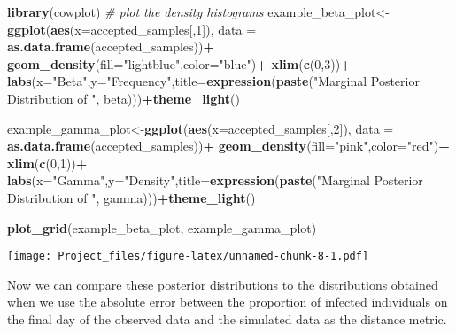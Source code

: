 \documentclass[
]{article}
\newenvironment{Shaded}{\begin{snugshade}}{\end{snugshade}}
\newcommand{\AttributeTok}[1]{\textcolor[rgb]{0.13,0.29,0.53}{#1}}
\newcommand{\CommentTok}[1]{\textcolor[rgb]{0.56,0.35,0.01}{\textit{#1}}}
\newcommand{\DecValTok}[1]{\textcolor[rgb]{0.00,0.00,0.81}{#1}}
\newcommand{\FunctionTok}[1]{\textcolor[rgb]{0.13,0.29,0.53}{\textbf{#1}}}
\newcommand{\NormalTok}[1]{#1}
\newcommand{\OtherTok}[1]{\textcolor[rgb]{0.56,0.35,0.01}{#1}}
\newcommand{\SpecialCharTok}[1]{\textcolor[rgb]{0.81,0.36,0.00}{\textbf{#1}}}
\newcommand{\StringTok}[1]{\textcolor[rgb]{0.31,0.60,0.02}{#1}}
\begin{document}
\begin{Shaded}
\begin{Highlighting}[]
\FunctionTok{library}\NormalTok{(cowplot)}
\CommentTok{\# plot the density histograms}
\NormalTok{example\_beta\_plot}\OtherTok{\textless{}{-}}\FunctionTok{ggplot}\NormalTok{(}\FunctionTok{aes}\NormalTok{(}\AttributeTok{x=}\NormalTok{accepted\_samples[,}\DecValTok{1}\NormalTok{]), }\AttributeTok{data =} \FunctionTok{as.data.frame}\NormalTok{(accepted\_samples))}\SpecialCharTok{+}
  \FunctionTok{geom\_density}\NormalTok{(}\AttributeTok{fill=}\StringTok{"lightblue"}\NormalTok{,}\AttributeTok{color=}\StringTok{"blue"}\NormalTok{)}\SpecialCharTok{+}
  \FunctionTok{xlim}\NormalTok{(}\FunctionTok{c}\NormalTok{(}\DecValTok{0}\NormalTok{,}\DecValTok{3}\NormalTok{))}\SpecialCharTok{+}
  \FunctionTok{labs}\NormalTok{(}\AttributeTok{x=}\StringTok{"Beta"}\NormalTok{,}\AttributeTok{y=}\StringTok{"Frequency"}\NormalTok{,}\AttributeTok{title=}\FunctionTok{expression}\NormalTok{(}\FunctionTok{paste}\NormalTok{(}\StringTok{"Marginal Posterior Distribution of "}\NormalTok{, beta)))}\SpecialCharTok{+}\FunctionTok{theme\_light}\NormalTok{()}

\NormalTok{example\_gamma\_plot}\OtherTok{\textless{}{-}}\FunctionTok{ggplot}\NormalTok{(}\FunctionTok{aes}\NormalTok{(}\AttributeTok{x=}\NormalTok{accepted\_samples[,}\DecValTok{2}\NormalTok{]), }\AttributeTok{data =} \FunctionTok{as.data.frame}\NormalTok{(accepted\_samples))}\SpecialCharTok{+}
  \FunctionTok{geom\_density}\NormalTok{(}\AttributeTok{fill=}\StringTok{"pink"}\NormalTok{,}\AttributeTok{color=}\StringTok{"red"}\NormalTok{)}\SpecialCharTok{+}
  \FunctionTok{xlim}\NormalTok{(}\FunctionTok{c}\NormalTok{(}\DecValTok{0}\NormalTok{,}\DecValTok{1}\NormalTok{))}\SpecialCharTok{+}
  \FunctionTok{labs}\NormalTok{(}\AttributeTok{x=}\StringTok{"Gamma"}\NormalTok{,}\AttributeTok{y=}\StringTok{"Density"}\NormalTok{,}\AttributeTok{title=}\FunctionTok{expression}\NormalTok{(}\FunctionTok{paste}\NormalTok{(}\StringTok{"Marginal Posterior Distribution of "}\NormalTok{, gamma)))}\SpecialCharTok{+}\FunctionTok{theme\_light}\NormalTok{()}

\FunctionTok{plot\_grid}\NormalTok{(example\_beta\_plot, example\_gamma\_plot)}
\end{Highlighting}
\end{Shaded}

\texttt{[image: Project\_files/figure-latex/unnamed-chunk-8-1.pdf]}

Now we can compare these posterior distributions to the distributions
obtained when we use the absolute error between the proportion of
infected individuals on the final day of the observed data and the
simulated data as the distance metric.
\end{document}
